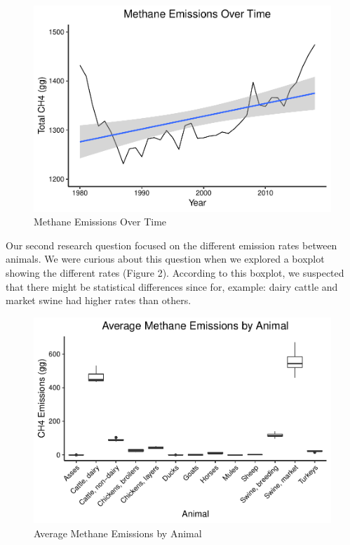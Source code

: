 \documentclass[
  12pt,
]{article}
\begin{document}
\begin{figure}
\centering
\includegraphics{Methane_Project_Template_files/figure-latex/unnamed-chunk-2-1.pdf}
\caption{Methane Emissions Over Time}
\end{figure}

Our second research question focused on the different emission rates
between animals. We were curious about this question when we explored a
boxplot showing the different rates (Figure 2). According to this
boxplot, we suspected that there might be statistical differences since
for, example: dairy cattle and market swine had higher rates than
others.

\begin{figure}
\centering
\includegraphics{Methane_Project_Template_files/figure-latex/viewing boxplot of methane by animal-1.pdf}
\caption{Average Methane Emissions by Animal}
\end{figure}
\end{document}
